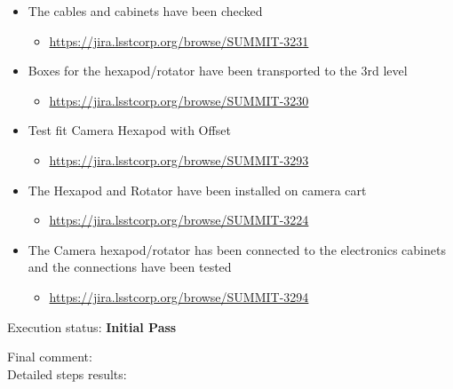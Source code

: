 \documentclass[SE,lsstdraft,STR,toc]{lsstdoc}
\providecommand{\tightlist}{
  \setlength{\itemsep}{0pt}\setlength{\parskip}{0pt}}
\begin{document}
\begin{itemize}
\tightlist
\item
  The cables and cabinets have been checked~

  \begin{itemize}
  \tightlist
  \item
    \url{https://jira.lsstcorp.org/browse/SUMMIT-3231}
  \end{itemize}
\item
  Boxes for the hexapod/rotator have been transported to the 3rd level

  \begin{itemize}
  \tightlist
  \item
    \url{https://jira.lsstcorp.org/browse/SUMMIT-3230}
  \end{itemize}
\item
  Test fit Camera Hexapod with Offset

  \begin{itemize}
  \tightlist
  \item
    \url{https://jira.lsstcorp.org/browse/SUMMIT-3293}
  \end{itemize}
\item
  The Hexapod and Rotator have been installed on camera cart

  \begin{itemize}
  \tightlist
  \item
    \url{https://jira.lsstcorp.org/browse/SUMMIT-3224}
  \end{itemize}
\item
  The Camera hexapod/rotator has been connected to the electronics
  cabinets and the connections have been tested

  \begin{itemize}
  \tightlist
  \item
    \url{https://jira.lsstcorp.org/browse/SUMMIT-3294}
  \end{itemize}
\end{itemize}


Execution status: {\bf Initial Pass }

Final comment:\\


Detailed steps results:
\end{document}
